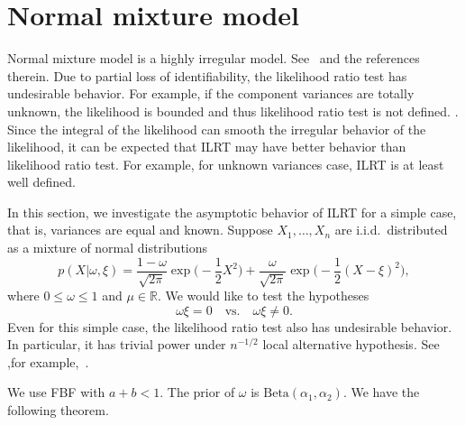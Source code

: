 \documentclass[11pt]{article}
\theoremstyle{plain}
\theoremstyle{definition}
\theoremstyle{remark}
\begin{document}
\section{Normal mixture model}
Normal mixture model is a highly irregular model.
See~\cite{chenjiahua2017} and the references therein.
Due to partial loss of identifiability, the likelihood ratio test has undesirable behavior.
For example, if the component variances are totally unknown, the likelihood is bounded and thus likelihood ratio test is not defined. \citep{Cam1990Maximum}.
Since the integral of the likelihood can smooth the irregular behavior of the likelihood, it can be expected that ILRT may have better behavior than likelihood ratio test.
For example, for unknown variances case, ILRT is at least well defined.

In this section, we investigate the asymptotic behavior of ILRT for a simple case, that is, variances are equal and known.
Suppose $X_1,\ldots,X_n$ are i.i.d.\ distributed as a mixture of normal distributions
\begin{equation*}
    p(X|\omega,\xi)=\frac{1-\omega}{\sqrt{2\pi}}\exp\big(-\frac{1}{2}X^2\big)
+\frac{\omega}{\sqrt{2\pi}}\exp\big(-\frac{1}{2}(X-\xi)^2\big),
\end{equation*}
where $0\leq \omega \leq 1$ and $\mu\in \mathbb{R}$.
We would like to test the hypotheses
\begin{equation}
    \omega \xi=0
    \quad \text{vs.}\quad
    \omega \xi \neq 0.
    \label{newHy}
\end{equation}
Even for this simple case, the likelihood ratio test also has undesirable behavior. In particular, it has trivial power under $n^{-1/2}$ local alternative hypothesis. See ,for example,~\cite{HALL2005158}.


We use FBF with $a+b<1$. The prior of $\omega$ is $\text{Beta}(\alpha_1,\alpha_2)$.
We have the following theorem.
\end{document}
